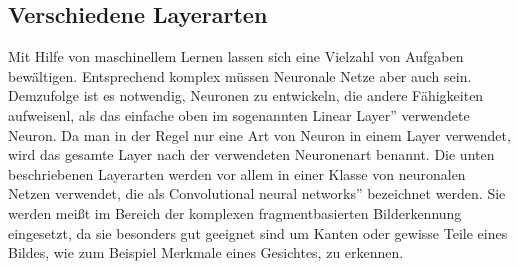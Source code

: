 \documentclass{article}
\begin{document}
\subsection{Verschiedene Layerarten}
Mit Hilfe von maschinellem Lernen lassen sich eine Vielzahl von Aufgaben bewältigen. Entsprechend komplex müssen Neuronale Netze aber auch sein. Demzufolge ist es notwendig, Neuronen zu entwickeln, die andere Fähigkeiten aufweisenl, als das einfache oben im sogenannten \glqq Linear Layer'' verwendete Neuron. Da man in der Regel nur eine Art von Neuron in einem Layer verwendet, wird das gesamte Layer nach der verwendeten Neuronenart benannt. Die unten beschriebenen Layerarten werden vor allem in einer Klasse von neuronalen Netzen verwendet, die als \glqq Convolutional neural networks'' bezeichnet werden. Sie werden meißt im Bereich der komplexen fragmentbasierten Bilderkennung eingesetzt, da sie besonders gut geeignet sind um Kanten oder gewisse Teile eines Bildes, wie zum Beispiel Merkmale eines Gesichtes, zu erkennen.
\end{document}
